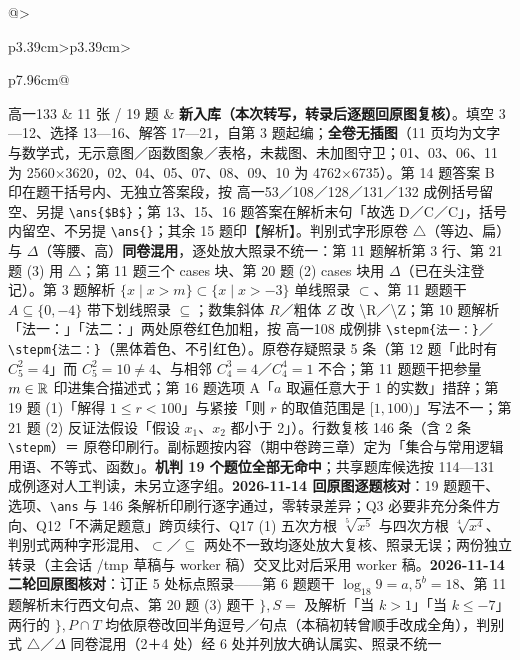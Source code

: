 \documentclass[a4paper,11pt]{article}
\begin{document}
\begin{xltabular}{\textwidth}{@{}>{\raggedright\arraybackslash}p{3.39cm}>{\centering\arraybackslash}p{3.39cm}>{\raggedright\arraybackslash}p{7.96cm}@{}}
高一133 & 11 张 / 19 题 & \textbf{新入库（本次转写，转录后逐题回原图复核）}。填空 3---12、选择 13---16、解答 17---21，自第 3 题起编；\textbf{全卷无插图}（11 页均为文字与数学式，无示意图／函数图象／表格，未裁图、未加图守卫；01、03、06、11 为 2560$\times$3620，02、04、05、07、08、09、10 为 4762$\times$6735）。第 14 题答案 B 印在题干括号内、无独立答案段，按 高一53／108／128／131／132 成例括号留空、另提 \texttt{\textbackslash{}ans\{\$B\$\}}；第 13、15、16 题答案在解析末句「故选 D／C／C」，括号内留空、不另提 \texttt{\textbackslash{}ans\{\}}；其余 15 题印【解析】。判别式字形原卷 \(\triangle\)（等边、扁）与 \(\Delta\)（等腰、高）\textbf{同卷混用}，逐处放大照录不统一：第 11 题解析第 3 行、第 21 题 (3) 用 \(\triangle\)；第 11 题三个 cases 块、第 20 题 (2) cases 块用 \(\Delta\)（已在头注登记）。第 3 题解析 \(\{x\mid\allowbreak  x>m\}\subset\allowbreak \{x\mid\allowbreak  x>-3\}\) 单线照录 \(\subset\allowbreak \)、第 11 题题干 \(A\subseteq\allowbreak \{0,\allowbreak -4\}\) 带下划线照录 \(\subseteq\allowbreak \)；数集斜体 \(R\)／粗体 \(Z\) 改 \textbackslash R／\textbackslash Z；第 10 题解析「法一：」「法二：」两处原卷红色加粗，按 高一108 成例排 \texttt{\textbackslash{}stepm\{法一：\}}／\texttt{\textbackslash{}stepm\{法二：\}}（黑体着色、不引红色）。原卷存疑照录 5 条（第 12 题「此时有 \(C_5^2=\allowbreak 4\)」而 \(C_5^2=\allowbreak 10\ne4\)、与相邻 \(C_4^3=\allowbreak 4\)／\(C_4^4=\allowbreak 1\) 不合；第 11 题题干把参量 \(m\in\mathbb{R}\) 印进集合描述式；第 16 题选项 A「\(a\) 取遍任意大于 1 的实数」措辞；第 19 题 (1)「解得 \(1\leq r<100\)」与紧接「则 \(r\) 的取值范围是 \([1,\allowbreak 100)\)」写法不一；第 21 题 (2) 反证法假设「假设 \(x_1\)、\(x_2\) 都小于 2」）。行数复核 146 条（含 2 条 \texttt{\textbackslash{}stepm}）＝ 原卷印刷行。副标题按内容（期中卷跨三章）定为「集合与常用逻辑用语、不等式、函数」。\textbf{机判 19 个题位全部无命中}；共享题库候选按 114---131 成例逐对人工判读，未另立逐字组。\textbf{2026-11-14 回原图逐题核对}：19 题题干、选项、\texttt{\textbackslash{}ans} 与 146 条解析印刷行逐字通过，零转录差异；Q3 必要非充分条件方向、Q12「不满足题意」跨页续行、Q17 (1) 五次方根 \(\sqrt[5]{x^5}\) 与四次方根 \(\sqrt[4]{x^4}\)、判别式两种字形混用、\(\subset\allowbreak \)／\(\subseteq\allowbreak \) 两处不一致均逐处放大复核、照录无误；两份独立转录（主会话 /tmp 草稿与 worker 稿）交叉比对后采用 worker 稿。\textbf{2026-11-14 二轮回原图核对}：订正 5 处标点照录------第 6 题题干 \(\log_{18}9=a,\allowbreak 5^b=\allowbreak 18\)、第 11 题解析末行西文句点、第 20 题 (3) 题干 \(\},S=\allowbreak \) 及解析「当 \(k>1\)」「当 \(k\leqslant\allowbreak -7\)」两行的 \(\},P\cap\allowbreak  T\) 均依原卷改回半角逗号／句点（本稿初转曾顺手改成全角），判别式 \(\triangle\)／\(\Delta\) 同卷混用（2＋4 处）经 6 处并列放大确认属实、照录不统一 \\ \addlinespace[1pt]

\end{xltabular}
\end{document}
